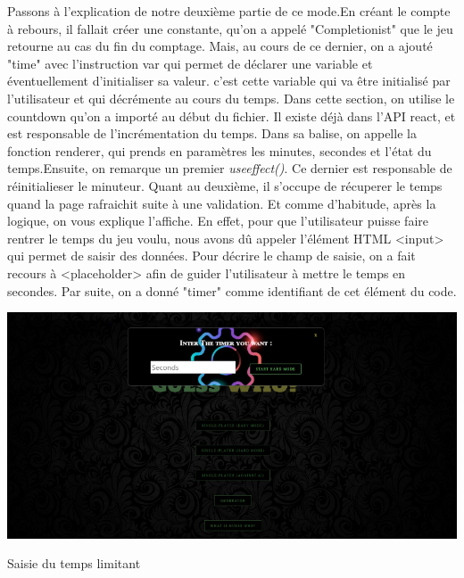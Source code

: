 \documentclass[a4paper, 12pt]{article}
\begin{document}
Passons à l'explication de notre deuxième partie de ce mode.\newline En créant le compte à rebours, il fallait créer une constante, qu'on a appelé "Completionist" que le jeu retourne au cas du fin du comptage. Mais, au cours de ce dernier, on a ajouté "time" avec l'instruction var qui permet de déclarer une variable et éventuellement d'initialiser sa valeur. c'est cette variable qui va être initialisé par l'utilisateur et qui décrémente au cours du temps. \newline
Dans cette section, on utilise le countdown qu'on a importé au début du fichier. Il existe déjà dans l'API react, et est responsable de l'incrémentation du temps. Dans sa balise, on appelle la fonction renderer, qui prends en paramètres les minutes, secondes et l'état du temps.Ensuite, on remarque un premier \textit{useeffect()}. Ce dernier  est responsable de réinitialieser le minuteur. Quant au deuxième, il s'occupe de récuperer le temps quand la page rafraichit suite à une validation. \newline
Et comme d'habitude, après la logique, on vous explique l'affiche. En effet, pour que l'utilisateur puisse faire rentrer le temps du jeu voulu, nous avons dû appeler l'élément HTML <input> qui permet de saisir des données. Pour décrire le champ de saisie, on a fait recours à <placeholder> afin de guider l'utilisateur à mettre le temps en secondes. Par suite, on a donné "timer" comme identifiant de cet élément du code. \newline

\begin{center}               %
  \includegraphics[scale=0.5]{timer1.png}\newline  %

\end{center}
\begin{center}
  Saisie du temps limitant
\end{center}
\end{document}
